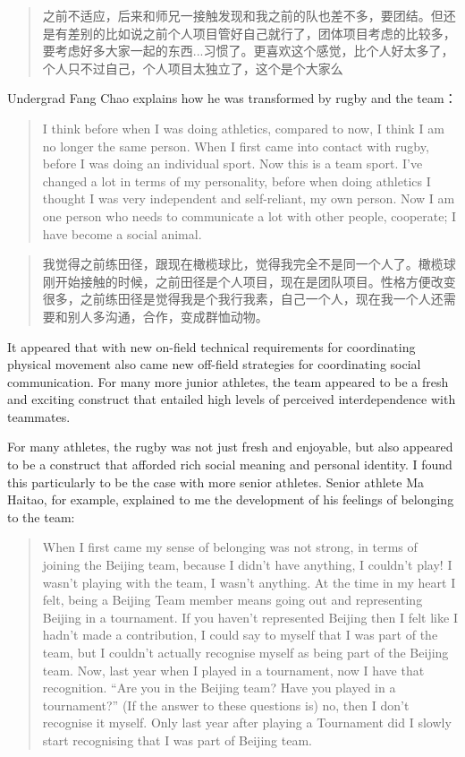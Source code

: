 \begin{CJK}{UTF8}{gbsn}
  \begin{quote}
    之前不适应，后来和师兄一接触发现和我之前的队也差不多，要团结。但还是有差别的比如说之前个人项目管好自己就行了，团体项目考虑的比较多，要考虑好多大家一起的东西...习惯了。更喜欢这个感觉，比个人好太多了，个人只不过自己，个人项目太独立了，这个是个大家么 \\
  \end{quote}

Undergrad Fang Chao explains how he was transformed by rugby and the team：

  \begin{quote}
    I think before when I was doing athletics, compared to now, I think I am no longer the same person.  When I first came into contact with rugby, before I was doing an individual sport.  Now this is a team sport. I've changed a lot in terms of my personality, before when doing athletics I thought I was very independent and self-reliant, my own person.  Now I am one person who needs to communicate a lot with other people, cooperate; I have become a social animal.
  \end{quote}

  \begin{quote}
    我觉得之前练田径，跟现在橄榄球比，觉得我完全不是同一个人了。橄榄球刚开始接触的时候，之前田径是个人项目，现在是团队项目。性格方便改变很多，之前练田径是觉得我是个我行我素，自己一个人，现在我一个人还需要和别人多沟通，合作，变成群恤动物。
  \end{quote}

It appeared that with new on-field technical requirements for coordinating physical movement also came new off-field strategies for coordinating social communication.  For many more junior athletes, the team appeared to be a fresh and exciting construct that entailed high levels of perceived interdependence with teammates.

For many athletes, the rugby was not just fresh and enjoyable, but also appeared to be a construct that afforded rich social meaning and personal identity. I found this particularly to be the case with more senior athletes.  Senior athlete Ma Haitao, for example, explained to me the development of his feelings of belonging to the team:
    \begin{quote}
      When I first came my sense of belonging was not strong, in terms of joining the Beijing team, because I didn't have anything, I couldn't play! I wasn't playing with the team, I wasn't anything.  At the time in my heart I felt, being a Beijing Team member means going out and representing Beijing in a tournament.  If you haven't represented Beijing then I felt like I hadn't made a contribution, I could say to myself that I was part of the team, but I couldn't actually recognise myself as being part of the Beijing team.  Now, last year when I played in a tournament, now I have that recognition. ``Are you in the Beijing team? Have you played in a tournament?'' (If the answer to these questions is) no, then I don't recognise it myself.  Only last year after playing a Tournament did I slowly start recognising that I was part of Beijing team.
    \end{quote}


\end{CJK}
